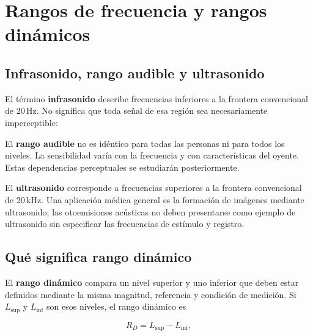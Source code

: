 \section{Rangos de frecuencia y rangos dinámicos}
\label{sec:u5-rangos}

\subsection{Infrasonido, rango audible y ultrasonido}
\label{sec:u5-infra-audible-ultra}


El término \textbf{infrasonido} describe frecuencias inferiores a la frontera
convencional de \(20\,\text{Hz}\). No significa que toda señal de esa región
sea necesariamente imperceptible: 

El \textbf{rango audible} no es idéntico para todas las personas ni para todos
los niveles. La sensibilidad varía con la frecuencia y con características
del oyente. Estas dependencias perceptuales se estudiarán posteriormente.

El \textbf{ultrasonido} corresponde a frecuencias superiores a la frontera
convencional de \(20\,\text{kHz}\). Una aplicación médica general es la
formación de imágenes mediante ultrasonido; las otoemisiones acústicas no
deben presentarse como ejemplo de ultrasonido sin especificar las frecuencias
de estímulo y registro.

\subsection{Qué significa rango dinámico}
\label{sec:u5-rango-dinamico}

El \textbf{rango dinámico} compara un nivel superior y uno inferior que deben
estar definidos mediante la misma magnitud, referencia y condición de
medición. Si \(L_\mathrm{sup}\) y \(L_\mathrm{inf}\) son esos niveles, el
rango dinámico es

\begin{equation}
    R_D=L_\mathrm{sup}-L_\mathrm{inf},
    \label{eq:u5-rango-dinamico}
\end{equation}

